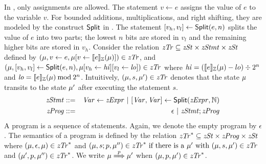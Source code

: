 In \zdsl, only assignments are allowed.
The statement $v \leftarrow e$ assigns the value of $e$
to the variable $v$. For bounded additions, multiplications, and right
shifting, they are modeled by the construct $\mbox{\textsf{Split}}$ in \zdsl.
The statement ${[}{v_h}, {v_l}{]} \leftarrow
\mbox{\textsf{Split}}(e, n)$ splits the value of $e$ into two parts;
the lowest $n$ bits are stored in $v_l$ and the remaining higher bits
are stored in $v_h$.
Consider the relation $\mathit{zTr} \subseteq \mathit{zSt} \times \mathit{zStmt} \times \mathit{zSt}$ defined
by $(\mu, v \leftarrow e, \mu{[}{v} \leftarrow {[\![{e}]\!]_{\mathbb{Z}}(\mu)}{]}) \in \mathit{zTr}$, and
  $(\mu, {[}{v_h}, {v_l}{]} \leftarrow \mbox{\textsf{Split}} (e, n),
  \mu{[}{v_h} \leftarrow {\mathit{hi}}{]}{[}{v_l} \leftarrow {\mathit{lo}}{]}) \in \mathit{zTr}$
where
$\mathit{hi} = ([\![{e}]\!]_{\mathbb{Z}}(\mu) - lo) \div 2^{n}$ and
$\mathit{lo} = [\![{e}]\!]_{\mathbb{Z}}(\mu) \mathbin{\textmd{mod}} 2^{n}$.
Intuitively, $(\mu, s, \mu') \in \mathit{zTr}$ denotes that the state $\mu$ transits to
the state $\mu'$ after executing the statement $s$.
\begin{eqnarray*}
  \mathit{zStmt} & ::= & \mathit{Var} \leftarrow \mathit{zExpr}
            \ |\  {[}{\mathit{Var}}, {\mathit{Var}}{]} \leftarrow \mbox{\textsf{Split}} (\mathit{zExpr}, \mathbb{N}) \\
  \mathit{zProg} & ::= & \epsilon \ |\ \mathit{zStmt}; \mathit{zProg}
\end{eqnarray*}
A program is a sequence of statements. Again, we denote the empty program by
$\epsilon$.
The semantics of a program is defined by the relation
$\mathit{zTr}^* \subseteq \mathit{zSt} \times \mathit{zProg} \times \mathit{zSt}$ where
$(\mu, \epsilon, \mu) \in \mathit{zTr}^*$ and
$(\mu, s; p, \mu'') \in \mathit{zTr}^* \textmd{ if }
    \textmd{there is a } \mu' \textmd{ with }
    (\mu, s, \mu') \in \mathit{zTr}$ and
    $(\mu', p, \mu'') \in \mathit{zTr}^*$.
We write $\mu \overset{p}{\Longrightarrow} \mu'$ when $(\mu, p, \mu') \in \mathit{zTr}^*$.


